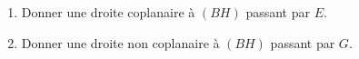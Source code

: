 
\begin{exercice}\label{exosmath-0079}

    \begin{multicols}{2}
        \begin{enumerate}
            \item
        Donner une droite coplanaire à \( (BH)\) passant par \( E\).
    \item
        Donner une droite non coplanaire à \( (BH)\) passant par \( G\).
                
        \end{enumerate}
        \columnbreak

    \end{multicols}

\end{exercice}
